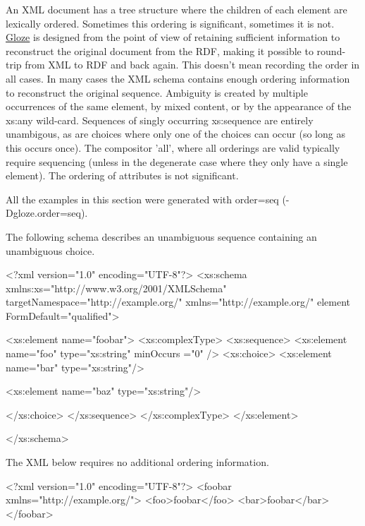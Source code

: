 An XML document has a tree structure where the children of each element are lexically ordered. Sometimes this ordering is significant, sometimes it is not. \hyperlink{classcom_1_1hp_1_1gloze_1_1_gloze}{Gloze} is designed from the point of view of retaining sufficient information to reconstruct the original document from the RDF, making it possible to round-\/trip from XML to RDF and back again. This doesn't mean recording the order in all cases. In many cases the XML schema contains enough ordering information to reconstruct the original sequence. Ambiguity is created by multiple occurrences of the same element, by mixed content, or by the appearance of the xs:any wild-\/card. Sequences of singly occurring xs:sequence are entirely unambigous, as are choices where only one of the choices can occur (so long as this occurs once). The compositor 'all', where all orderings are valid typically require sequencing (unless in the degenerate case where they only have a single element). The ordering of attributes is not significant.

All the examples in this section were generated with order=seq (-\/Dgloze.order=seq).

The following schema describes an unambiguous sequence containing an unambiguous choice.


\begin{DoxyCodeInclude}
<?xml version="1.0" encoding="UTF-8"?>
<xs:schema xmlns:xs="http://www.w3.org/2001/XMLSchema" 
        targetNamespace="http://example.org/" xmlns="http://example.org/" element
      FormDefault="qualified">

        <xs:element name="foobar">
                <xs:complexType>
                        <xs:sequence>
                                <xs:element name="foo" type="xs:string" minOccurs
      ="0" />
                                <xs:choice>
                                        <xs:element name="bar" type="xs:string"/>
      
                                        <xs:element name="baz" type="xs:string"/>
      
                                </xs:choice>
                        </xs:sequence>
                </xs:complexType>
        </xs:element>

</xs:schema>
\end{DoxyCodeInclude}


The XML below requires no additional ordering information.


\begin{DoxyCodeInclude}
<?xml version="1.0" encoding="UTF-8"?>
<foobar xmlns="http://example.org/">
        <foo>foobar</foo>
        <bar>foobar</bar>
</foobar>

\end{DoxyCodeInclude}
 
